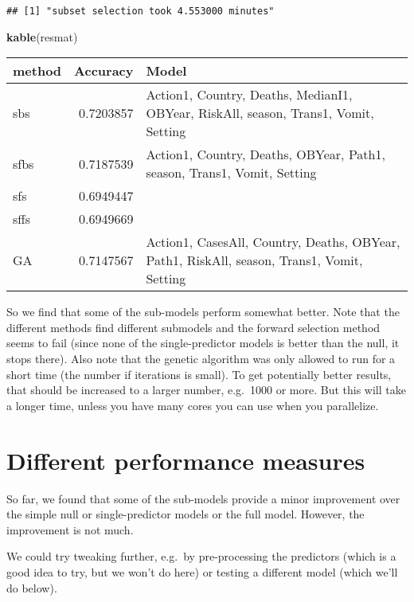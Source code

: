 \documentclass[]{article}
\newenvironment{Shaded}{\begin{snugshade}}{\end{snugshade}}
\newcommand{\KeywordTok}[1]{\textcolor[rgb]{0.13,0.29,0.53}{\textbf{#1}}}
\newcommand{\NormalTok}[1]{#1}
\begin{document}
\begin{verbatim}
## [1] "subset selection took 4.553000 minutes"
\end{verbatim}

\begin{Shaded}
\begin{Highlighting}[]
\KeywordTok{kable}\NormalTok{(resmat)}
\end{Highlighting}
\end{Shaded}

\begin{longtable}[]{@{}lrl@{}}
\toprule
method & Accuracy & Model\tabularnewline
\midrule
\endhead
sbs & 0.7203857 & Action1, Country, Deaths, MedianI1, OBYear, RiskAll,
season, Trans1, Vomit, Setting\tabularnewline
sfbs & 0.7187539 & Action1, Country, Deaths, OBYear, Path1, season,
Trans1, Vomit, Setting\tabularnewline
sfs & 0.6949447 &\tabularnewline
sffs & 0.6949669 &\tabularnewline
GA & 0.7147567 & Action1, CasesAll, Country, Deaths, OBYear, Path1,
RiskAll, season, Trans1, Vomit, Setting\tabularnewline
\bottomrule
\end{longtable}

So we find that some of the sub-models perform somewhat better. Note
that the different methods find different submodels and the forward
selection method seems to fail (since none of the single-predictor
models is better than the null, it stops there). Also note that the
genetic algorithm was only allowed to run for a short time (the number
if iterations is small). To get potentially better results, that should
be increased to a larger number, e.g.~1000 or more. But this will take a
longer time, unless you have many cores you can use when you
parallelize.

\hypertarget{different-performance-measures}{%
\section{Different performance
measures}\label{different-performance-measures}}

So far, we found that some of the sub-models provide a minor improvement
over the simple null or single-predictor models or the full model.
However, the improvement is not much.

We could try tweaking further, e.g.~by pre-processing the predictors
(which is a good idea to try, but we won't do here) or testing a
different model (which we'll do below).
\end{document}
